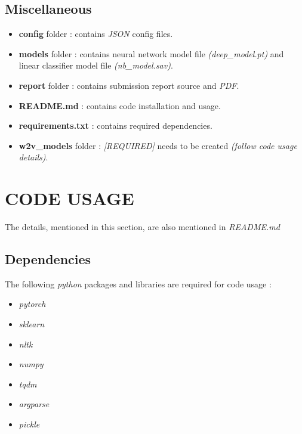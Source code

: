 \documentclass[letterpaper, 10 pt, conference]{ieeeconf}  %
\begin{document}
\subsection{Miscellaneous}
\begin{itemize}
    \item \textbf{config} folder : contains \emph{JSON} config files.
    \item \textbf{models} folder : contains neural network model file \emph{(deep\_model.pt)} and linear classifier model file \emph{(nb\_model.sav)}.
    \item \textbf{report} folder : contains submission report source and \emph{PDF}.
    \item \textbf{README.md} : contains code installation and usage.
    \item \textbf{requirements.txt} : contains required dependencies.
    \item \textbf{w2v\_models} folder : \emph{[REQUIRED]} needs to be created \emph{(follow code usage details)}.
\end{itemize}


\section{CODE USAGE}
The details, mentioned in this section, are also mentioned in \emph{README.md}

\subsection{Dependencies}
The following \emph{python} packages and libraries are required for code usage :
\begin{itemize}
    \item \emph{pytorch}
    \item \emph{sklearn}
    \item \emph{nltk}
    \item \emph{numpy}
    \item \emph{tqdm}
    \item \emph{argparse}
    \item \emph{pickle}
\end{itemize}
\end{document}
